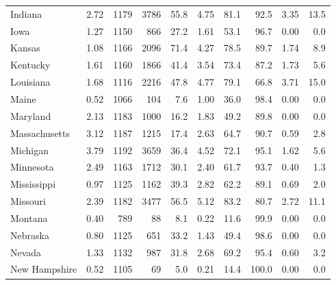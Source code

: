 \begin{tabular}{lrrrrrrrrr}
Indiana & \num{2.72} & \num{1179} & \num{3786} & \num{55.8} & \num{4.75} & \num{81.1} & \num{92.5} & \num{3.35} & \num{13.5} \\
Iowa & \num{1.27} & \num{1150} & \num{866} & \num{27.2} & \num{1.61} & \num{53.1} & \num{96.7} & \num{0.00} & \num{0.0} \\
Kansas & \num{1.08} & \num{1166} & \num{2096} & \num{71.4} & \num{4.27} & \num{78.5} & \num{89.7} & \num{1.74} & \num{8.9} \\
Kentucky & \num{1.61} & \num{1160} & \num{1866} & \num{41.4} & \num{3.54} & \num{73.4} & \num{87.2} & \num{1.73} & \num{5.6} \\
Louisiana & \num{1.68} & \num{1116} & \num{2216} & \num{47.8} & \num{4.77} & \num{79.1} & \num{66.8} & \num{3.71} & \num{15.0} \\
Maine & \num{0.52} & \num{1066} & \num{104} & \num{7.6} & \num{1.00} & \num{36.0} & \num{98.4} & \num{0.00} & \num{0.0} \\
Maryland & \num{2.13} & \num{1183} & \num{1000} & \num{16.2} & \num{1.83} & \num{49.2} & \num{89.8} & \num{0.00} & \num{0.0} \\
Massachusetts & \num{3.12} & \num{1187} & \num{1215} & \num{17.4} & \num{2.63} & \num{64.7} & \num{90.7} & \num{0.59} & \num{2.8} \\
Michigan & \num{3.79} & \num{1192} & \num{3659} & \num{36.4} & \num{4.52} & \num{72.1} & \num{95.1} & \num{1.62} & \num{5.6} \\
Minnesota & \num{2.49} & \num{1163} & \num{1712} & \num{30.1} & \num{2.40} & \num{61.7} & \num{93.7} & \num{0.40} & \num{1.3} \\
Mississippi & \num{0.97} & \num{1125} & \num{1162} & \num{39.3} & \num{2.82} & \num{62.2} & \num{89.1} & \num{0.69} & \num{2.0} \\
Missouri & \num{2.39} & \num{1182} & \num{3477} & \num{56.5} & \num{5.12} & \num{83.2} & \num{80.7} & \num{2.72} & \num{11.1} \\
Montana & \num{0.40} & \num{789} & \num{88} & \num{8.1} & \num{0.22} & \num{11.6} & \num{99.9} & \num{0.00} & \num{0.0} \\
Nebraska & \num{0.80} & \num{1125} & \num{651} & \num{33.2} & \num{1.43} & \num{49.4} & \num{98.6} & \num{0.00} & \num{0.0} \\
Nevada & \num{1.33} & \num{1132} & \num{987} & \num{31.8} & \num{2.68} & \num{69.2} & \num{95.4} & \num{0.60} & \num{3.2} \\
New Hampshire & \num{0.52} & \num{1105} & \num{69} & \num{5.0} & \num{0.21} & \num{14.4} & \num{100.0} & \num{0.00} & \num{0.0} \\

\end{tabular}
